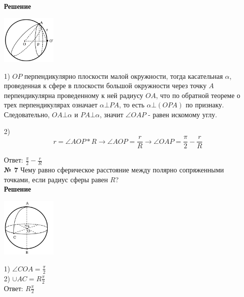     \textbf{Решение}\\

    \begin{center}
        \includegraphics[width=0.2\textwidth]{images/img12}\\
    \end{center}

    1) $OP$ перпендикулярно плоскости малой окружности, тогда касательная $\alpha$, проведенная к сфере
    в плоскости большой окружности через точку $A$ перпендикулярна проведенному к ней радиусу $OA$,
    что по обратной теореме о трех перпендикулярах означает $\alpha \bot PA$, то есть $\alpha \bot (OPA)$ по признаку.
    Следовательно, $OA \bot \alpha$ и $PA \bot \alpha$, значит $\angle OAP$ - равен искомому углу.

    2)
    \[
        r = \angle AOP * R \rightarrow \angle AOP = \frac{r}{R} \rightarrow \angle OAP = \frac{\pi}{2} - \frac{r}{R}
    \]

    Ответ: $\frac{\pi}{2} - \frac{r}{R}$\\

    \textbf{№ 7}
    Чему равно сферическое расстояние между полярно сопряженными точками, если радиус сферы равен $R$?\\

    \textbf{Решение}\\

    \begin{center}
        \includegraphics[width=0.2\textwidth]{images/img13}\\
    \end{center}

    1) $\angle COA = \frac{\pi}{2}$\\

    2) $\cup AC = R\frac{\pi}{2}$\\

    Ответ: $R\frac{\pi}{2}$\\

